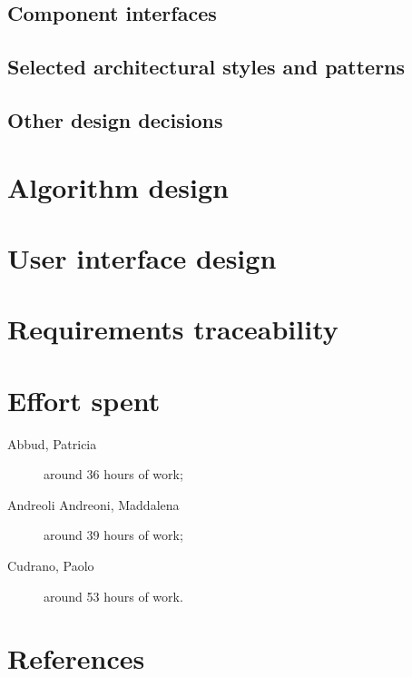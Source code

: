 \documentclass[12pt, a4paper]{article}
\begin{document}
		\subsection{Component interfaces}
		\label{sec:components_interfaces}
			

		\subsection{Selected  architectural  styles  and  patterns}
			
			

		\subsection{Other design decisions}
			

	\newpage
	\section{Algorithm design}
	\label{sec:algorithm_design}
		

	\newpage
	\section{User interface design}
	\label{sec:user_interface_design}
		

	\newpage
	\section{Requirements traceability}
		

	\newpage
	\section{Effort spent}
		\begin{description}
			\item[Abbud, Patricia] around 36 hours of work;
			\item[Andreoli Andreoni, Maddalena] around 39 hours of work;
			\item[Cudrano, Paolo] around 53 hours of work.
		\end{description}

	\newpage
	\section{References}
\end{document}
